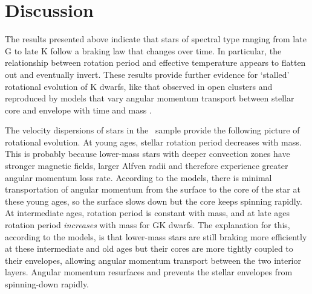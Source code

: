 \section{Discussion}
\label{sec:discussion}


The results presented above indicate that stars of spectral type ranging from
late G to late K follow a braking law that changes over time.
In particular, the relationship between rotation period and effective
temperature appears to flatten out and eventually invert.
These results provide further evidence for `stalled' rotational evolution of K
dwarfs, like that observed in open clusters \citep{curtis2019} and reproduced
by models that vary angular momentum transport between stellar core and
envelope with time and mass \citep{spada2019}.

The velocity dispersions of stars in the \mct\ sample provide the following
picture of rotational evolution.
At young ages, stellar rotation period decreases with mass.
This is probably because lower-mass stars with deeper convection zones have
stronger magnetic fields, larger Alfven radii and therefore experience greater
angular momentum loss rate.
According to the \citet{spada2019} models, there is minimal transportation of
angular momentum from the surface to the core of the star at these young ages,
so the surface slows down but the core keeps spinning rapidly.
At intermediate ages, rotation period is constant with mass, and at late ages
rotation period {\it increases} with mass for GK dwarfs.
The explanation for this, according to the \citet{spada2019} models, is that
lower-mass stars are still braking more efficiently at these intermediate and
old ages but their cores are more tightly coupled to their envelopes, allowing
angular momentum transport between the two interior layers.
Angular momentum resurfaces and prevents the stellar envelopes from
spinning-down rapidly.

